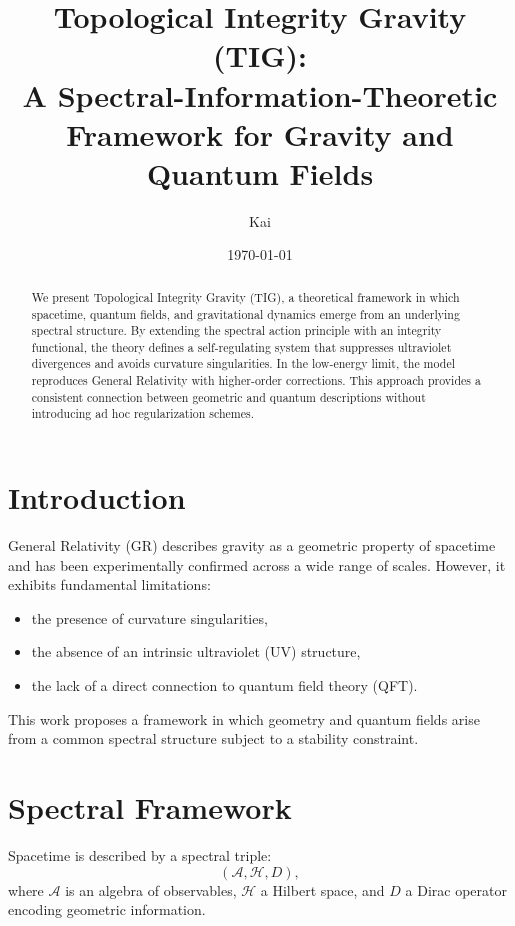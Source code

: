 \documentclass[11pt,a4paper]{article}
\title{\textbf{Topological Integrity Gravity (TIG):\\
A Spectral-Information-Theoretic Framework for Gravity and Quantum Fields}}
\author{Kai}
\date{\today}
\begin{document}
\maketitle

\begin{abstract}
We present Topological Integrity Gravity (TIG), a theoretical framework in which spacetime, quantum fields, and gravitational dynamics emerge from an underlying spectral structure. By extending the spectral action principle with an integrity functional, the theory defines a self-regulating system that suppresses ultraviolet divergences and avoids curvature singularities. In the low-energy limit, the model reproduces General Relativity with higher-order corrections. This approach provides a consistent connection between geometric and quantum descriptions without introducing ad hoc regularization schemes.
\end{abstract}

\section{Introduction}

General Relativity (GR) describes gravity as a geometric property of spacetime and has been experimentally confirmed across a wide range of scales. However, it exhibits fundamental limitations:

\begin{itemize}
\item the presence of curvature singularities,
\item the absence of an intrinsic ultraviolet (UV) structure,
\item the lack of a direct connection to quantum field theory (QFT).
\end{itemize}

This work proposes a framework in which geometry and quantum fields arise from a common spectral structure subject to a stability constraint.

\section{Spectral Framework}

Spacetime is described by a spectral triple:
\begin{equation}
(\mathcal{A}, \mathcal{H}, D),
\end{equation}
where $\mathcal{A}$ is an algebra of observables, $\mathcal{H}$ a Hilbert space, and $D$ a Dirac operator encoding geometric information.
\end{document}
